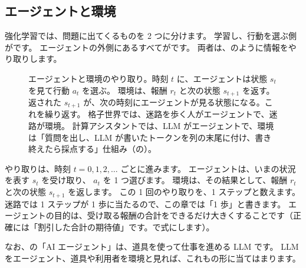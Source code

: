 \subsection*{エージェントと環境}

強化学習では、問題に出てくるものを 2 つに分けます。
学習し、行動を選ぶ側がです。
エージェントの外側にあるすべてがです。
両者は、のように情報をやり取りします。

\begin{figure}[tbp]
\centering
{}
\caption{エージェントと環境のやり取り。時刻 $t$ に、エージェントは状態 $s_t$ を見て行動 $a_t$ を選ぶ。
環境は、報酬 $r_t$ と次の状態 $s_{t+1}$ を返す。返された $s_{t+1}$ が、次の時刻にエージェントが見る状態になる。これを繰り返す。
格子世界では、迷路を歩く人がエージェントで、迷路が環境。
計算アシスタントでは、LLM がエージェントで、環境は「質問を出し、LLM が書いたトークンを列の末尾に付け、書き終えたら採点する」仕組み（の）。}
\label{fig:rlb-agent-env}
\end{figure}

やり取りは、時刻 $t=0,1,2,\dots$ ごとに進みます。
エージェントは、いまの状況を表す $s_t$ を受け取り、 $a_t$ を 1 つ選びます。
環境は、その結果として、報酬 $r_t$ と次の状態 $s_{t+1}$ を返します。
この 1 回のやり取りを、1 ステップと数えます。
迷路では 1 ステップが 1 歩に当たるので、この章では「1 歩」と書きます。
エージェントの目的は、受け取る報酬の合計をできるだけ大きくすることです（正確には「割引した合計の期待値」です。で式にします）。

なお、の「AI エージェント」は、道具を使って仕事を進める LLM です。
LLM をエージェント、道具や利用者を環境と見れば、これもの形に当てはまります。

